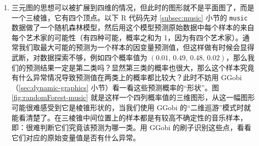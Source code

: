 \documentclass[
  b5paper,
  UTF8,twoside]{book}
\newenvironment{Shaded}{\begin{snugshade}}{\end{snugshade}}
\newcommand{\AttributeTok}[1]{\textcolor[rgb]{0.13,0.29,0.53}{#1}}
\newcommand{\CommentTok}[1]{\textcolor[rgb]{0.56,0.35,0.01}{\textit{#1}}}
\newcommand{\DecValTok}[1]{\textcolor[rgb]{0.00,0.00,0.81}{#1}}
\newcommand{\FunctionTok}[1]{\textcolor[rgb]{0.13,0.29,0.53}{\textbf{#1}}}
\newcommand{\NormalTok}[1]{#1}
\newcommand{\OtherTok}[1]{\textcolor[rgb]{0.56,0.35,0.01}{#1}}
\newcommand{\SpecialCharTok}[1]{\textcolor[rgb]{0.81,0.36,0.00}{\textbf{#1}}}
\newcommand{\StringTok}[1]{\textcolor[rgb]{0.31,0.60,0.02}{#1}}
\begin{document}
\begin{enumerate}
\def\labelenumi{\arabic{enumi}.}
\item
  三元图的思想可以被扩展到四维的情况，但此时的图形就不是平面图了，而是一个三棱锥，它有四个顶点。以下 R 代码先对 \ref{subsec:music} 小节的 \texttt{music} 数据做了一个随机森林模型，然后用这个模型预测原始数据中每个样本的来自每个艺术家的可能性（有四种可能，概率之和为 1，因为有四个艺术家）。通常我们取最大可能的预测为一个样本的因变量预测值，但这样做有时候会显得武断，对数据探索不够，例如四个概率值为 \((0.01,\,0.49,\,0.48,\,0.02)\)，那么我们的预测结果一定是第二类吗？显然第三类的概率也很大，那么这个样本究竟有什么异常情况导致预测值在两类上的概率都比较大？此时不妨用 GGobi （\ref{sec:dynamic-graphics} 小节）看一看这些预测概率的``形状''。图 \ref{fig:randomForest-music} 就是这样一个四列概率值的三维图形，从这一幅图形可能很难感受到它是棱锥形状的，当我们使用 GGobi 的``二维巡游''模式时就能看清楚了。在三棱锥中间位置上的样本都是有较高不确定性的音乐样本，即：很难判断它们究竟该预测为哪一类。用 GGobi 的刷子识别这些点，看看它们对应的原始变量值是否有什么异常。

\begin{Shaded}
\end{Shaded}


\end{enumerate}
\end{document}
